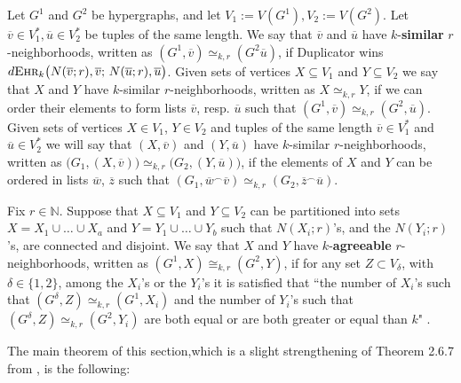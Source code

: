 \documentclass[12pt,notitlepage,a4paper]{article}
\theoremstyle{definition}
\newcommand{\N}{\mathbb{N}}
\newcommand{\ehr}{\textsc{Ehr}}
\begin{document}
Let $G^1$ and $G^2$ be hypergraphs, and let
$V_1:=V(G^1), V_2:=V(G^2)$.
Let $\overline{v} \in V_1^*, 
\overline{u} \in V_2^*$ be tuples of the same length.
We say that $\overline{v}$ and $\overline{u}$ have
$k$-\textbf{similar} $r$-neighborhoods, written as
$(G^1,\overline{v})\simeq_{k,r}(G^2 \overline{u})$, if Duplicator wins
$d\ehr_k\big(N(\overline{v};r),
\overline{v};\, N(\overline{u};r),\overline{u}\big)$.
Given sets of vertices $X\subseteq V_1$ and $Y\subseteq V_2$
we say that $X$ and $Y$ have $k$-similar
$r$-neighborhoods, written as
$X\simeq_{k,r} Y$, if we can order their elements to form
lists $\overline{v}$, resp. $\overline{u}$ such that 
$(G^1,\overline{v})\simeq_{k,r}(G^2,\overline{u})$. 
Given sets of vertices $X\in V_1$, $Y\in V_2$ and 
tuples of the same length $\overline{v}\in V_1^*$ and
$\overline{u}\in V_2^*$ we will say that $(X,\overline{v})$ 
and $(Y,\overline{u})$ have $k$-similar $r$-neighborhoods,
written as $\big(G_1, (X,\overline{v})  \big)
\simeq_{k,r} \big(G_2, (Y,\overline{u})  \big)$, if
the elements of $X$ and $Y$ can be ordered in lists
$\overline{w}$, $\overline{z}$ such that
$(G_1,\overline{w}^\smallfrown \overline{v})
\simeq_{k,r} (G_2,\overline{z}^\smallfrown \overline{u})$. \par
Fix $r\in \N$. Suppose that $X\subseteq V_1$ and 
$Y\subseteq V_2$ can
be partitioned into sets $X=X_1\cup \dots \cup X_a$
and $Y=Y_1\cup \dots \cup Y_b$ 
such that $N(X_i;r)$'s, and the
$N(Y_i;r)$'s, are connected and disjoint. 
We say that $X$ and
$Y$ have $k$-\textbf{agreeable} $r$-neighborhoods,
written as $(G^1,X)\cong_{k,r} (G^2,Y)$, 
if for any set $Z\subset V_\delta$, with $\delta\in \{1,2\}$,
among the $X_i$'s or the $Y_i$'s
it is satisfied that ``the number of $X_i$'s  
such that $(G^\delta, Z) \simeq_{k,r} (G^1,X_i)$ 
and the number of $Y_i$'s such that
$(G^\delta,Z)\simeq_{k,r} (G^2,Y_i)$
are both equal or are both greater 
or equal than $k$" .

The main theorem of this section,which
is a slight strengthening of Theorem 
2.6.7 from \cite{spencer2013strange}, is the following:
\end{document}
